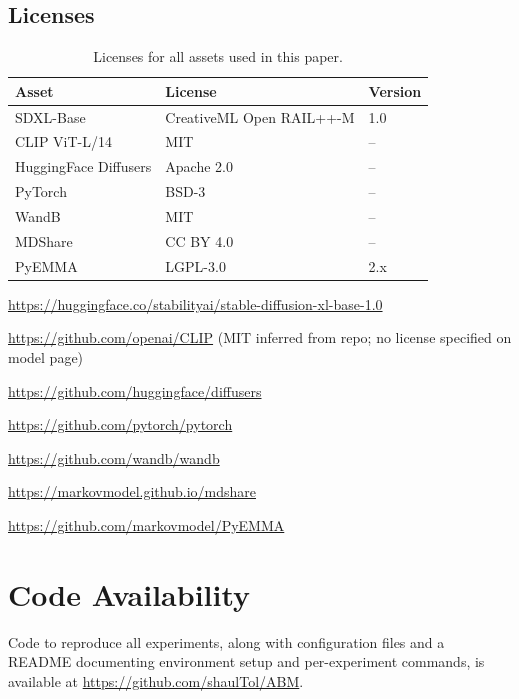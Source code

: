 \documentclass{article}
\newcommand{\repomain}{https://github.com/shaulTol/ABM}
\newcommand{\repomain}{https://anonymous.4open.science/r/ABM-1423/README.md}
\begin{document}
\subsection{Licenses}

\begin{table}[H]
\centering
\caption{Licenses for all assets used in this paper.}
\label{tab:licenses}
\begin{threeparttable}
\begin{tabular}{lll}
\toprule
\textbf{Asset} & \textbf{License} & \textbf{Version} \\
\midrule
SDXL-Base\tnote{1}             & CreativeML Open RAIL++-M & 1.0 \\
CLIP ViT-L/14\tnote{2}         & MIT                      & --  \\
HuggingFace Diffusers\tnote{4} & Apache 2.0               & --  \\
PyTorch\tnote{3}               & BSD-3                    & --  \\
WandB\tnote{4}                 & MIT                      & --  \\
MDShare\tnote{5}               & CC BY 4.0                & --  \\
PyEMMA\tnote{6}                & LGPL-3.0                 & 2.x \\
\bottomrule
\end{tabular}
\begin{tablenotes}
\footnotesize
\item[1] \url{https://huggingface.co/stabilityai/stable-diffusion-xl-base-1.0}
\item[2] \url{https://github.com/openai/CLIP} (MIT inferred from repo; no license specified on model page)
\item[3] \url{https://github.com/huggingface/diffusers}
\item[4] \url{https://github.com/pytorch/pytorch}
\item[5] \url{https://github.com/wandb/wandb}
\item[6] \url{https://markovmodel.github.io/mdshare}
\item[7] \url{https://github.com/markovmodel/PyEMMA}
\end{tablenotes}
\end{threeparttable}
\end{table}

\section{Code Availability}
\label{app:code}

Code to reproduce all experiments, along with configuration files and a README documenting environment setup and per-experiment commands, is available at \url{\repomain}.

% 



% 
\end{document}
